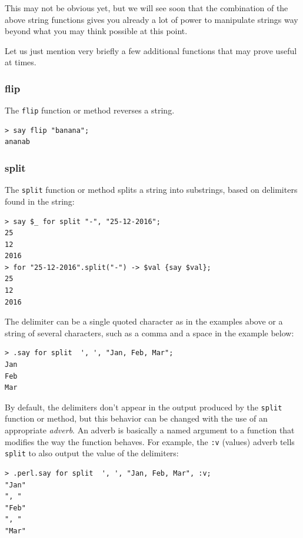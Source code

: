 This may not be obvious yet, but we will see soon 
that the combination of the above string functions gives you 
already a lot of power to manipulate strings way beyond what 
you may think possible at this point.

Let us just mention very briefly a few additional functions 
that may prove useful at times.

\subsubsection{flip}

The {\tt flip} function or method reverses a string.

\begin{verbatim}
> say flip "banana";
ananab
\end{verbatim}
%

\subsubsection{split}
The {\tt split} function or method splits a string 
into substrings, based on delimiters found in the string:

\begin{verbatim}
> say $_ for split "-", "25-12-2016";
25
12
2016
> for "25-12-2016".split("-") -> $val {say $val};
25
12
2016
\end{verbatim}

The delimiter can be a single quoted character as in the 
examples above or a string of several characters, such as 
a comma and a space in the example below:

\begin{verbatim}
> .say for split  ', ', "Jan, Feb, Mar";
Jan
Feb
Mar
\end{verbatim}

By default, the delimiters don't appear in the output produced 
by the {\tt split} function or method, but this behavior can 
be changed with the use of an appropriate \emph{adverb}. An adverb 
is basically a named argument to a function that modifies 
the way the function behaves. For example, the {\tt :v} (values) adverb 
tells {\tt split} to also output the value of the delimiters:

\begin{verbatim}
> .perl.say for split  ', ', "Jan, Feb, Mar", :v;
"Jan"
", "
"Feb"
", "
"Mar"
\end{verbatim}

